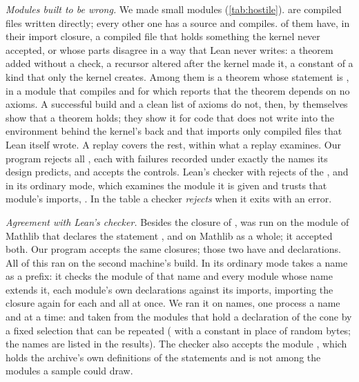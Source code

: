 \emph{Modules built to be wrong.} We made \hostilemodules{} small modules
(\cref{tab:hostile}). \hostilecrafted{} are compiled files written directly; every other one
has a source and compiles. \hostilebad{} of them have, in their import closure, a compiled
file that holds
something the kernel never accepted, or whose parts disagree in a way that Lean never writes:
a theorem added without a check, a recursor altered after
the kernel made it, a constant of a kind that only the kernel creates. Among them is a theorem
whose statement is , in a module that compiles and for which 
reports that the theorem depends on no axioms. A successful build and a clean list of axioms
do not, then, by themselves show that a theorem holds; they show it for code that does not
write into the environment behind the kernel's back and that imports only compiled files
that Lean itself wrote. A replay covers the rest, within
what a replay examines. Our program rejects all \hostilebad{}, each with failures recorded
under exactly the names its design predicts, and accepts the \hostilecontrols{} controls.
Lean's checker with
 rejects \hostilefreshrejects{} of the \hostilebad{}, and in its ordinary mode,
which examines the module it is given and trusts that module's imports,
\hostiledefaultrejects{}. In the table a checker \emph{rejects} when it exits with an error.



\emph{Agreement with Lean's checker.} Besides the closure of ,
 was run on
the module of Mathlib that declares the statement , and on Mathlib as
a whole; it accepted both. Our program
accepts the same closures; those two have \stockreplayrzdecls{} and
\stockreplaymathlibdecls{} declarations. All of this ran on the second machine's build.
\ifsecondrun
In its ordinary mode  takes a name as a prefix: it checks the module of
that name and every module whose name extends it, each module's own declarations against
its imports, importing the closure again for each and all at once. We ran it on
\stocksample{} names, one process a name and \stocksampleatatime{} at a time: 
and \stocksampledrawn{} taken from the modules that hold a declaration of the cone by a
fixed selection that can be repeated ( with a constant in place of random bytes;
the names are listed in the results). \stockprefixnote{} \stocksamplenote{} The checker also
accepts the module , which holds the archive's own definitions of the
statements and is not among the modules a sample could draw.
\fi

